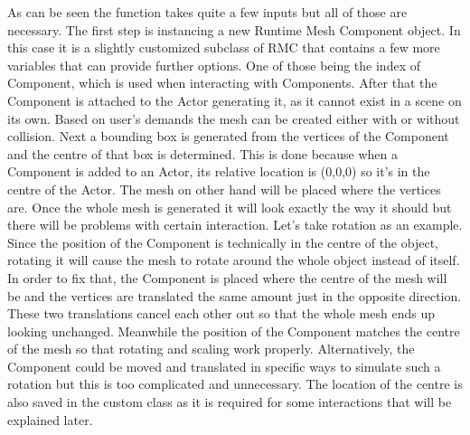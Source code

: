 As can be seen the function takes quite a few inputs but all of those are necessary. The first step is instancing a new Runtime Mesh Component object. In this case it is a slightly customized subclass of \acs{RMC} that contains a few more variables that can provide further options. One of those being the index of Component, which is used when interacting with Components. After that the Component is attached to the Actor generating it, as it cannot exist in a scene on its own. Based on user's demands the mesh can be created either with or without collision. Next a bounding box is generated from the vertices of the Component and the centre of that box is determined. This is done because when a Component is added to an Actor, its relative location is (0,0,0) so it's in the centre of the Actor. The mesh on other hand will be placed where the vertices are. Once the whole mesh is generated it will look exactly the way it should but there will be problems with certain interaction. Let's take rotation as an example. Since the position of the Component is technically in the centre of the object, rotating it will cause the mesh to rotate around the whole object instead of itself. In order to fix that, the Component is placed where the centre of the mesh will be and the vertices are translated the same amount just in the opposite direction. These two translations cancel each other out so that the whole mesh ends up looking unchanged. Meanwhile the position of the Component matches the centre of the mesh so that rotating and scaling work properly. Alternatively, the Component could be moved and translated in specific ways to simulate such a rotation but this is too complicated and unnecessary. The location of the centre is also saved in the custom class as it is required for some interactions that will be explained later.\\
